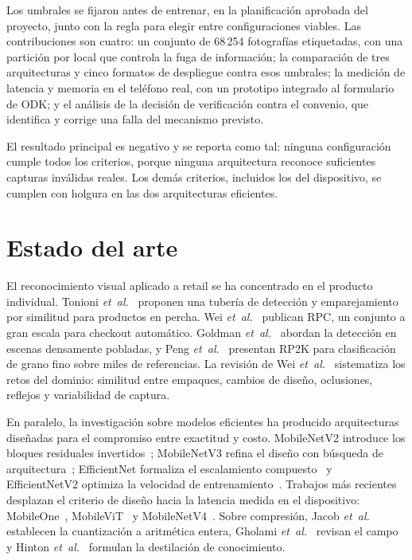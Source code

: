 \documentclass[conference]{IEEEtran}
\begin{document}
Los umbrales se fijaron antes de entrenar, en la planificación aprobada del proyecto, junto con la regla para elegir
entre configuraciones viables. Las contribuciones son cuatro: un conjunto de 68\,254 fotografías etiquetadas, con
una partición por local que controla la fuga de información; la comparación de tres arquitecturas y cinco formatos
de despliegue contra esos umbrales; la medición de latencia y memoria en el teléfono real, con un prototipo
integrado al formulario de ODK; y el análisis de la decisión de verificación contra el convenio, que identifica y
corrige una falla del mecanismo previsto.

El resultado principal es negativo y se reporta como tal: ninguna configuración cumple todos los criterios, porque
ninguna arquitectura reconoce suficientes capturas inválidas reales. Los demás criterios, incluidos los del
dispositivo, se cumplen con holgura en las dos arquitecturas eficientes.

\section{Estado del arte}

El reconocimiento visual aplicado a retail se ha concentrado en el producto individual. Tonioni
\textit{et~al.}~\cite{tonioni2018} proponen una tubería de detección y emparejamiento por similitud para productos
en percha. Wei \textit{et~al.}~\cite{wei2019rpc} publican RPC, un conjunto a gran escala para checkout automático.
Goldman \textit{et~al.}~\cite{goldman2019} abordan la detección en escenas densamente pobladas, y Peng
\textit{et~al.}~\cite{peng2020rp2k} presentan RP2K para clasificación de grano fino sobre miles de referencias. La
revisión de Wei \textit{et~al.}~\cite{wei2020review} sistematiza los retos del dominio: similitud entre empaques,
cambios de diseño, oclusiones, reflejos y variabilidad de captura.

En paralelo, la investigación sobre modelos eficientes ha producido arquitecturas diseñadas para el compromiso entre
exactitud y costo. MobileNetV2 introduce los bloques residuales invertidos~\cite{sandler2018}; MobileNetV3 refina
el diseño con búsqueda de arquitectura~\cite{howard2019}; EfficientNet formaliza el escalamiento
compuesto~\cite{tan2019} y EfficientNetV2 optimiza la velocidad de entrenamiento~\cite{tan2021}. Trabajos más
recientes desplazan el criterio de diseño hacia la latencia medida en el dispositivo:
MobileOne~\cite{vasu2023}, MobileViT~\cite{mehta2022} y MobileNetV4~\cite{qin2024}. Sobre compresión, Jacob
\textit{et~al.}~\cite{jacob2018} establecen la cuantización a aritmética entera, Gholami
\textit{et~al.}~\cite{gholami2021} revisan el campo y Hinton \textit{et~al.}~\cite{hinton2015} formulan la
destilación de conocimiento.
\end{document}

